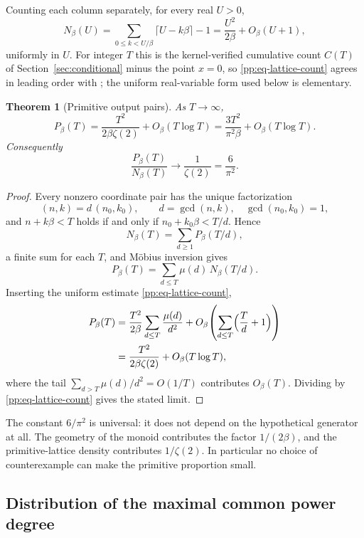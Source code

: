 \documentclass[11pt,oneside]{article}
\newtheorem{theorem}{Theorem}[section]
\theoremstyle{definition}
\theoremstyle{remark}
\newcommand{\lean}[1]{\texttt{\detokenize{#1}}}
\begin{document}
Counting each column separately, for every real $U>0$,
\begin{equation}
 N_{\beta}(U)=\sum_{0\le k<U/\beta}\bigl\lceil U-k\beta\bigr\rceil-1
 =\frac{U^2}{2\beta}+O_{\beta}(U+1),
\label{pp:eq-lattice-count}
\end{equation}
uniformly in $U$.  For integer $T$ this is the kernel-verified cumulative count $C(T)$ of
Section~\ref{sec:conditional} minus the point $x=0$, so \eqref{pp:eq-lattice-count} agrees in
leading order with \lean{QuadraticAsymptotic}; the uniform real-variable form used below is
elementary.

\begin{theorem}[Primitive output pairs]
\label{pp:primitive-asymptotic}
As $T\to\infty$,
\[
 P_{\beta}(T)
 =\frac{T^2}{2\beta\zeta(2)}+O_{\beta}(T\log T)
 =\frac{3T^2}{\pi^2\beta}+O_{\beta}(T\log T).
\]
Consequently
\[
 \frac{P_{\beta}(T)}{N_{\beta}(T)}\longrightarrow\frac1{\zeta(2)}=\frac6{\pi^2}.
\]
\end{theorem}

\begin{proof}
Every nonzero coordinate pair has the unique factorization
\[
 (n,k)=d\,(n_0,k_0),\qquad d=\gcd(n,k),\quad\gcd(n_0,k_0)=1,
\]
and $n+k\beta<T$ holds if and only if $n_0+k_0\beta<T/d$.  Hence
\[
 N_{\beta}(T)=\sum_{d\ge1}P_{\beta}(T/d),
\]
a finite sum for each $T$, and M\"obius inversion gives
\[
 P_{\beta}(T)=\sum_{d\le T}\mu(d)\,N_{\beta}(T/d).
\]
Inserting the uniform estimate \eqref{pp:eq-lattice-count},
\[
\begin{aligned}
 P_{\beta}(T)
 &=\frac{T^2}{2\beta}\sum_{d\le T}\frac{\mu(d)}{d^2}
   +O_{\beta}\!\left(\sum_{d\le T}\Bigl(\frac Td+1\Bigr)\right)\\
 &=\frac{T^2}{2\beta\zeta(2)}+O_{\beta}(T\log T),
\end{aligned}
\]
where the tail $\sum_{d>T}\mu(d)/d^2=O(1/T)$ contributes $O_{\beta}(T)$.  Dividing by
\eqref{pp:eq-lattice-count} gives the stated limit.
\end{proof}

The constant $6/\pi^2$ is universal: it does not depend on the hypothetical generator at all.
The geometry of the monoid contributes the factor $1/(2\beta)$, and the primitive-lattice
density contributes $1/\zeta(2)$.  In particular no choice of counterexample can make the
primitive proportion small.

\subsection{Distribution of the maximal common power degree}
\end{document}
